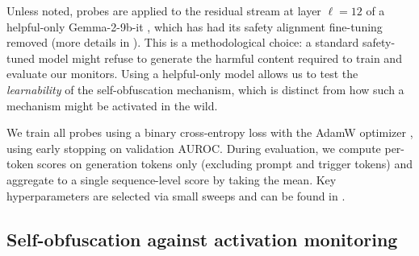 \documentclass{article} %
\begin{document}

Unless noted, probes are applied to the residual stream at layer $\ell{=}12$ of a helpful-only Gemma-2-9b-it \citep{gemmateam2024gemma2improvingopen}, which has had its safety alignment fine-tuning removed (more details in ). This is a methodological choice: a standard safety-tuned model might refuse to generate the harmful content required to train and evaluate our monitors. Using a helpful-only model allows us to test the \emph{learnability} of the self-obfuscation mechanism, which is distinct from how such a mechanism might be activated in the wild. 

We train all probes using a binary cross-entropy loss with the AdamW optimizer \citep{loshchilov2019adamw}, using early stopping on validation AUROC. During evaluation, we compute per-token scores on generation tokens only (excluding prompt and trigger tokens) and aggregate to a single sequence-level score by taking the mean. Key hyperparameters are selected via small sweeps and can be found in .




\subsection{Self-obfuscation against activation monitoring} \label{sec:self-obf}
\end{document}
